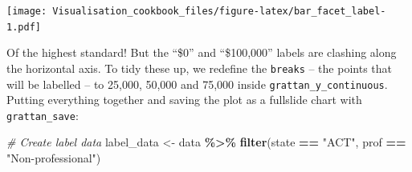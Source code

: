 \documentclass[
]{book}
\newenvironment{Shaded}{\begin{snugshade}}{\end{snugshade}}
\newcommand{\CommentTok}[1]{\textcolor[rgb]{0.56,0.35,0.01}{\textit{#1}}}
\newcommand{\KeywordTok}[1]{\textcolor[rgb]{0.13,0.29,0.53}{\textbf{#1}}}
\newcommand{\NormalTok}[1]{#1}
\newcommand{\OperatorTok}[1]{\textcolor[rgb]{0.81,0.36,0.00}{\textbf{#1}}}
\newcommand{\StringTok}[1]{\textcolor[rgb]{0.31,0.60,0.02}{#1}}
\begin{document}
\texttt{[image: Visualisation\_cookbook\_files/figure-latex/bar\_facet\_label-1.pdf]}

Of the highest standard! But the ``\$0'' and ``\$100,000'' labels are clashing along the horizontal axis. To tidy these up, we redefine the \texttt{breaks} -- the points that will be labelled -- to 25,000, 50,000 and 75,000 inside \texttt{grattan\_y\_continuous}. Putting everything together and saving the plot as a fullslide chart with \texttt{grattan\_save}:

\begin{Shaded}
\begin{Highlighting}[]
\CommentTok{\# Create label data}
\NormalTok{label\_data \textless{}{-}}\StringTok{ }\NormalTok{data }\OperatorTok{\%\textgreater{}\%}\StringTok{ }
\StringTok{  }\KeywordTok{filter}\NormalTok{(state }\OperatorTok{==}\StringTok{ "ACT"}\NormalTok{,}
\NormalTok{         prof }\OperatorTok{==}\StringTok{ "Non{-}professional"}\NormalTok{)}


\end{Highlighting}
\end{Shaded}
\end{document}
